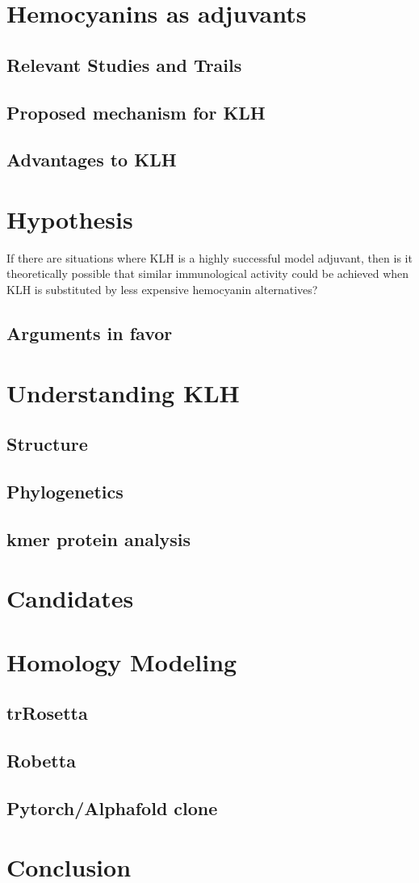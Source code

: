 \documentclass[a4paper]{article}
\begin{document}
\section{Hemocyanins as adjuvants}
\subsection{Relevant Studies and Trails}
\subsection{Proposed mechanism for KLH}
\subsection{Advantages to KLH}
\section{Hypothesis}
If there are situations where KLH is a highly successful model adjuvant, then is it theoretically possible that similar immunological activity could be achieved when KLH is substituted by less expensive hemocyanin alternatives?
\subsection{Arguments in favor}
\section{Understanding KLH}
\subsection{Structure}
\subsection{Phylogenetics}
\subsection{kmer protein analysis}
\section{Candidates}

\section{Homology Modeling}
\subsection{trRosetta}
\subsection{Robetta}
\subsection{Pytorch/Alphafold clone}

\section{Conclusion}
\printbibliography[]
\end{document}
